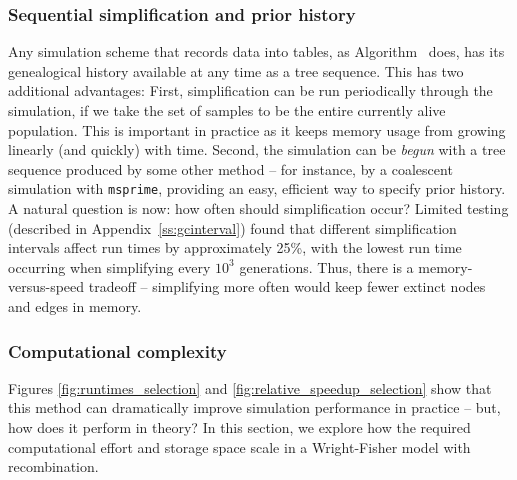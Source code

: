 \documentclass{article}
\newcommand{\msprime}{\texttt{msprime}}
\newcommand{\krt}[1]{{\em \color{green} #1}}
\begin{document}
\subsubsection*{Sequential simplification and prior history}
\label{ss:seq_simp}

Any simulation scheme that records data into tables,
as Algorithm~ does,
has its genealogical history available at any time as a tree sequence.
This has two additional advantages:
First, simplification can be run periodically through the simulation,
if we take the set of samples to be the entire currently alive population.
This is important in practice as it keeps memory usage from growing linearly (and quickly) with time.
Second, the simulation can
be \emph{begun} with a tree sequence produced by some other method -- for
instance, by a coalescent simulation with \msprime,
providing an easy, efficient way to specify prior history.
A natural question is now: how often should simplification occur?
Limited testing (described in Appendix~\ref{ss:gcinterval})
found that different simplification intervals affect run times by approximately
25\%, with the lowest run time occurring when simplifying every $10^3$ generations.
Thus, there is a memory-versus-speed tradeoff
-- simplifying more often would keep fewer extinct nodes and edges in memory.

%



\subsubsection*{Computational complexity}

Figures \ref{fig:runtimes_selection} and \ref{fig:relative_speedup_selection} show that this method
can dramatically improve simulation performance in practice --
but, how does it perform in theory?
In this section, we explore how the required computational effort and storage space scale
in a Wright-Fisher model with recombination.
\end{document}
